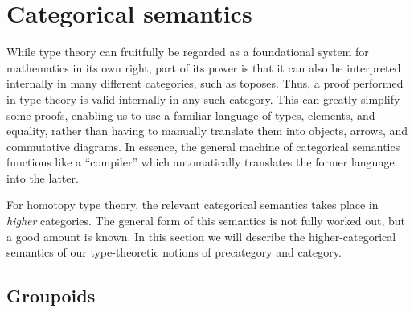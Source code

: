 \section{Categorical semantics}
\label{sec:semantics}

While type theory can fruitfully be regarded as a foundational system for mathematics in its own right, part of its power is that it can also be interpreted internally in many different categories, such as toposes.
Thus, a proof performed in type theory is valid internally in any such category.
This can greatly simplify some proofs, enabling us to use a familiar language of types, elements, and equality, rather than having to manually translate them into objects, arrows, and commutative diagrams.
In essence, the general machine of categorical semantics functions like a ``compiler'' which automatically translates the former language into the latter.

For homotopy type theory, the relevant categorical semantics takes place in \emph{higher} categories.
The general form of this semantics is not fully worked out, but a good amount is known.
In this section we will describe the higher-categorical semantics of our type-theoretic notions of precategory and category.

\subsection{Groupoids}
\label{sec:groupoids}

